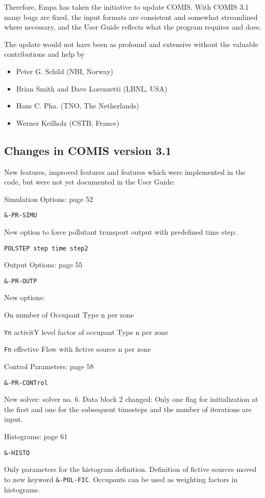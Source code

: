 \documentclass[10pt]{article}
\begin{document}
Therefore, Empa has taken the initiative to update COMIS. With COMIS 3.1 many bugs are fixed, the input formats are consistent and somewhat streamlined where necessary, and the User Guide reflects what the program requires and does.

The update would not have been as profound and extensive without the valuable contributions and help by

\begin{itemize}
\item Peter G. Schild (NBI, Norway)
\item Brian Smith and Dave Lorenzetti (LBNL, USA)
\item Hans C. Pha. (TNO, The Netherlands)
\item Werner Keilholz (CSTB, France)
\end{itemize}

\subsection{Changes in COMIS version 3.1}

New features, improved features and features which were implemented in the code, but were not yet documented in the User Guide:

Simulation Options: page 52

\verb|&-PR-SIMU|

New option to force pollutant transport output with predefined time step:

\verb|POLSTEP step time step2|

Output Options: page 55

\verb|&-PR-OUTP|

New options: 

On number of Occupant Type n per zone 

\verb|Yn| activitY level factor of occupant Type n per zone 

\verb|Fn| effective Flow with fictive source n per zone 

Control Parameters: page 58

\verb|&-PR-CONTrol|

New solver: solver no. 6. 
Data block 2 changed: Only one flag for initialization at the first and one for the subsequent timesteps and the number of iterations are input. 


Histograms: page 61

\verb|&-HISTO|

Only parameters for the histogram definition. Definition of fictive sources moved to new keyword \verb|&-POL-FIC|. Occupants can be used as weighting factors in histograms.
\end{document}
